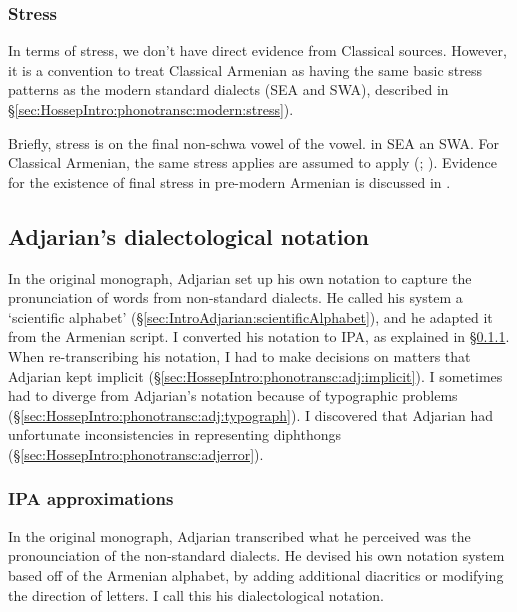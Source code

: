 \subsubsection{Stress}\label{sec:HossepIntro:phonotransc:CA:stress}

 
In terms of stress, we don't have direct evidence from Classical sources. However, it is a convention to treat Classical Armenian as having the same basic stress patterns as the modern standard dialects (SEA and SWA), described in \S\ref{sec:HossepIntro:phonotransc:modern:stress}). 

Briefly, stress  is on the final non-schwa vowel of the vowel. in SEA an SWA. For Classical Armenian, the same stress applies are assumed to apply (\citealt[15]{Thomson-1989-IntroClassicalArmenian}; \citealt[1043-4]{Macak-2017-PhonoClassicalArmenian}). Evidence for the existence of final stress in pre-modern Armenian is discussed in \citet{DeLisi-2018-ArmenianProsodyDiachrony}.





\subsection{Adjarian's dialectological notation }\label{sec:HossepIntro:phonotransc:adj}


In the original monograph, Adjarian set up his own notation to capture the pronunciation of words from  non-standard dialects. He called his system a `scientific alphabet'  (\S\ref{sec:IntroAdjarian:scientificAlphabet}), and he adapted it from the Armenian script. I converted his notation to IPA, as explained in \S\ref{sec:HossepIntro:phonotransc:adj:ipa}. When re-transcribing his notation, I had to make decisions on matters that Adjarian kept implicit (\S\ref{sec:HossepIntro:phonotransc:adj:implicit}). I sometimes had to diverge from Adjarian's notation because of   typographic problems (\S\ref{sec:HossepIntro:phonotransc:adj:typograph}). I discovered that Adjarian had unfortunate inconsistencies in representing diphthongs (\S\ref{sec:HossepIntro:phonotransc:adjerror}). 


\subsubsection{IPA approximations}\label{sec:HossepIntro:phonotransc:adj:ipa}

In the original monograph, Adjarian transcribed what he perceived was the pronounciation of the non-standard dialects. He devised his own notation system based off of the Armenian alphabet, by adding additional diacritics or modifying the direction of letters. I call this his dialectological notation. 

